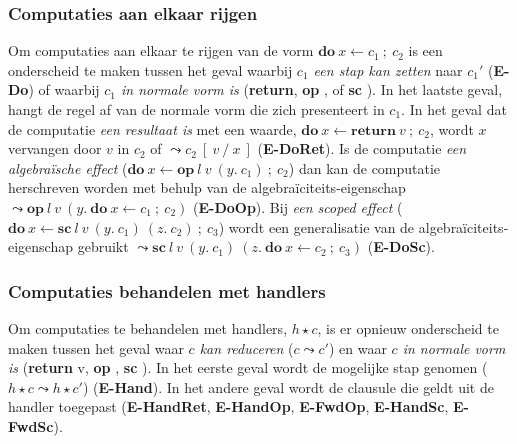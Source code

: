 \subsubsection{Computaties aan elkaar rijgen}
Om computaties aan elkaar te rijgen van de vorm $\textbf{do}\:x \leftarrow c_{1}\:;\:c_{2}$ is een onderscheid te maken tussen het geval waarbij \emph{$c_{1}$ een stap kan zetten} naar $c_{1}'$ (\textbf{E-Do}) of waarbij \emph{$c_{1}$ in normale vorm is} (\textbf{return}, \textbf{op \textellipsis}, of \textbf{sc \textellipsis}). \newline 
In het laatste geval, hangt de regel af van de normale vorm die zich presenteert in $c_{1}$. \newline 
In het geval dat de computatie \emph{een resultaat is} met een waarde, $\textbf{do}\:x \leftarrow \textbf{return}\:v\:;\:c_{2}$, wordt $x$ vervangen door $v$ in $c_{2}$ of $\leadsto c_{2}\:[\:v\:/\:x\:]$ (\textbf{E-DoRet}). \newline
Is de computatie \emph{een algebraïsche effect} ($\textbf{do} \  x \leftarrow \textbf{op} \  l \  v \  (y. \  c_{1}) \  ; \  c_{2}$) dan kan de computatie herschreven worden met behulp van de algebraïciteits-eigenschap $\leadsto \textbf{op} \  l \  v \  (y. \   \textbf{do} \   x \leftarrow c_{1} \  ; \  c_{2})$ (\textbf{E-DoOp}). \newline
Bij \emph{een scoped effect} ($\textbf{do}\:x \leftarrow \textbf{sc} \:l\:v\:(y.\:c_{1})\:(z.\:c_{2}) \: ;\: c_{3}$) wordt een generalisatie van de algebraïciteits-eigenschap gebruikt $\leadsto \textbf{sc} \:l\:v\:(y.\:c_{1})\:(z.\: \textbf{do} \: x \leftarrow c_{2} \: ;\: c_{3})$ (\textbf{E-DoSc}).

\subsubsection{Computaties behandelen met handlers}
Om computaties te behandelen met handlers, $h \star c$, is er opnieuw onderscheid te maken tussen het geval waar \emph{$c$ kan reduceren} ($c \leadsto c'$) en waar \emph{$c$ in normale vorm is} (\textbf{return} v, \textbf{op \textellipsis}, \textbf{sc \textellipsis}). \newline 
In het eerste geval wordt de mogelijke stap genomen ($h \star c \leadsto h \star c'$) (\textbf{E-Hand}). In het andere geval wordt de clausule die geldt uit de handler toegepast (\textbf{E-HandRet}, \textbf{E-HandOp}, \textbf{E-FwdOp}, \textbf{E-HandSc}, \textbf{E-FwdSc}).

